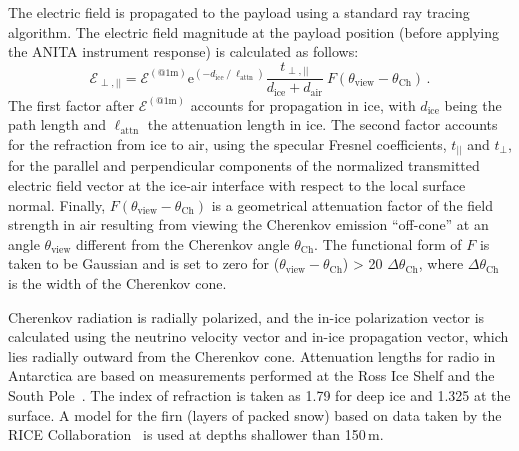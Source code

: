 
The electric field is propagated to the payload using a standard ray tracing algorithm.
The electric field magnitude at the payload position (before applying
the ANITA instrument response) is calculated as follows:
\begin{equation}
 \mathcal{E}_{\perp,||} = \mathcal{E}^{(\mathrm{@ 1m})}  
 \mathrm{e}^{(-d_{\mathrm{ice}}\ /\ \ell_{\mathrm{attn}})}
 \frac{t_{\perp,||}}{d_{\mathrm{ice}} + d_{\mathrm{air}}}
 \ F(\theta_{\mathrm{view}}-\theta_{\mathrm{Ch}}) \,.
\end{equation}
The first factor after $\mathcal{E}^{(\mathrm{@ 1m})}$ accounts for propagation in ice, with $d_{\mathrm{ice}}$ being the path length and $\ell_{\mathrm{attn}}$ the attenuation length in ice. 
The second factor accounts for the refraction from ice to air, using
the specular Fresnel coefficients, $t_{||}$ and $t_{\perp}$, for the parallel and perpendicular components of the normalized transmitted electric field vector at the ice-air interface with respect to the local surface normal.
Finally, $F(\theta_{\mathrm{view}}-\theta_{\mathrm{Ch}})$ is a geometrical attenuation factor of the field strength in air resulting from viewing the Cherenkov emission ``off-cone'' at an angle $\theta_{\mathrm{view}}$ different from the Cherenkov angle $\theta_{\mathrm{Ch}}$.
The functional form of $F$ is taken to be Gaussian and is set to zero for ($\theta_{\mathrm{view}}-\theta_{\mathrm{Ch}}$) > 20 $\Delta \theta_{\mathrm{Ch}}$, where $\Delta \theta_{\mathrm{Ch}}$ is the width of the Cherenkov cone. 


Cherenkov radiation is radially polarized, and the in-ice polarization vector is calculated using the neutrino velocity vector and in-ice propagation vector, which lies radially outward from the Cherenkov cone.
Attenuation lengths for radio in Antarctica are based on measurements performed at the Ross Ice Shelf and the South Pole~\cite{smex}.
The index of refraction is taken as 1.79 for deep ice and 1.325 at the surface. A model for the firn (layers of packed snow) based on data taken by the RICE Collaboration~\cite{PhysRevD.73.082002} is used at depths shallower than 150\,m.

